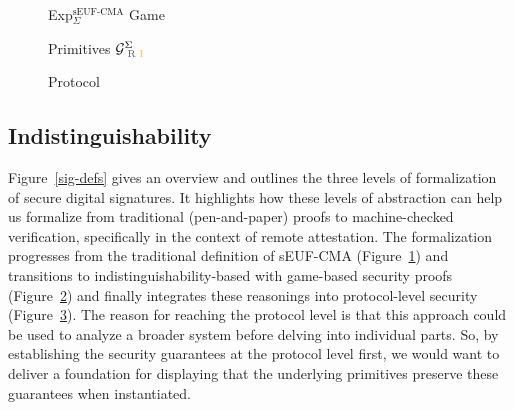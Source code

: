 \begin{figure*}
	\centering
	\begin{subfigure}[b]{0.8\columnwidth}
		\centering
		
		\caption{Exp$_\Sigma^{\text{sEUF-CMA}}$ Game}
		\label{fig:problem:eu}
	\end{subfigure}
%
	\begin{subfigure}[b]{0.8\columnwidth}
		\centering
		
		\caption{Primitives
        $ \mathcal{G}_{\text{ \textcolor{lGray}{R} \textcolor{lYellow}{I}} }^{\Sigma}$ 
    }
		\label{fig:problem:ind}
	\end{subfigure}
%
	\begin{subfigure}[b]{0.4\columnwidth}
		\centering
		
		\caption{Protocol}
		\label{fig:problem:eu-ind}
	\end{subfigure}
  \caption{
	Secure Signatures:
    \ref{fig:problem:ind}) the (classic) 
    security game for strong existential unforgability for the \emph{protocol of secure signatures}~\cite{goldwasser1988digital},
    \ref{fig:problem:ind}) indistinguishability
    between a real and an ideal (,i.e, semantic) implementation
    for the primitives of secure signatures~\cite{joy,companion}, and
    \ref{fig:problem:eu-ind} indistinguishability
    between the real and the ideal (i.e., semantic) composition
    of the \emph{protocol for secure signatures}.
    We (informally) argue that \ref{fig:problem:ind} captures
    the same notion of security as \ref{fig:problem:eu-ind}.
  }
	\label{sig-defs}
\end{figure*}


\subsection{Indistinguishability}
%
Figure~\ref{sig-defs} gives an overview and outlines the 
three levels of formalization of secure digital signatures. 
%
It highlights how these levels of abstraction can help us formalize from 
traditional (pen-and-paper) proofs to machine-checked verification, 
specifically in the context of remote attestation. 
%
The formalization progresses from the traditional definition of sEUF-CMA (Figure~\ref{fig:problem:eu}) and 
transitions to indistinguishability-based with game-based security proofs (Figure~\ref{fig:problem:ind}) and 
finally integrates these reasonings into protocol-level security (Figure~\ref{fig:problem:eu-ind}). 
%
The reason for reaching the protocol level is that this approach could 
be used to analyze a broader system before delving into individual parts. 
%
So, by establishing the security guarantees at the protocol level first, 
we would want to deliver a foundation for displaying that the underlying 
primitives preserve these guarantees when instantiated. 
%

